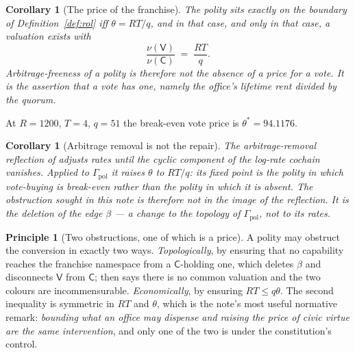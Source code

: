 \documentclass[11pt]{article}
\theoremstyle{plain}
\newtheorem{corollary}[theorem]{Corollary}
\theoremstyle{definition}
\newtheorem{principle}[theorem]{Principle}
\theoremstyle{remark}
\newcommand{\Vt}{\mathsf{V}}
\newcommand{\Ct}{\mathsf{C}}
\begin{document}
\begin{corollary}[The price of the franchise]
\label{cor:price}
The polity sits exactly on the boundary of Definition~\ref{def:rol} iff
$\theta = RT/q$, and in that case, and only in that case, a valuation exists
with
\[
  \frac{\nu(\Vt)}{\nu(\Ct)} \;=\; \frac{RT}{q}.
\]
Arbitrage-freeness of a polity is therefore not the absence of a price for a
vote. It is the assertion that a vote \emph{has} one, namely the office's
lifetime rent divided by the quorum.
\end{corollary}

At $R = 1200$, $T = 4$, $q = 51$ the break-even vote price is
$\theta^\ast = 94.1176$.

\begin{corollary}[Arbitrage removal is not the repair]
\label{cor:reflection}
The arbitrage-removal reflection of \cite[\S4]{vtok} adjusts rates until the
cyclic component of the log-rate cochain vanishes. Applied to
$\Gamma_{\mathrm{pol}}$ it raises $\theta$ to $RT/q$: its fixed point is the
polity in which vote-buying is break-even rather than the polity in which it is
absent. The obstruction sought in this note is therefore \emph{not in the image
of the reflection}. It is the deletion of the edge $\beta$ --- a change to the
topology of $\Gamma_{\mathrm{pol}}$, not to its rates.
\end{corollary}

\begin{principle}[Two obstructions, one of which is a price]
\label{prin:two}
A polity may obstruct the conversion in exactly two ways. \emph{Topologically},
by ensuring that no capability reaches the franchise namespace from a
$\Ct$-holding one, which deletes $\beta$ and disconnects $\Vt$ from $\Ct$;
\cite[\S10]{engine} then says there is no common valuation and the two colours
are incommensurable. \emph{Economically}, by ensuring $RT \le q\theta$. The
second inequality is symmetric in $RT$ and $\theta$, which is the note's most
useful normative remark: \emph{bounding what an office may dispense and raising
the price of civic virtue are the same intervention}, and only one of the two is
under the constitution's control.
\end{principle}
\end{document}
